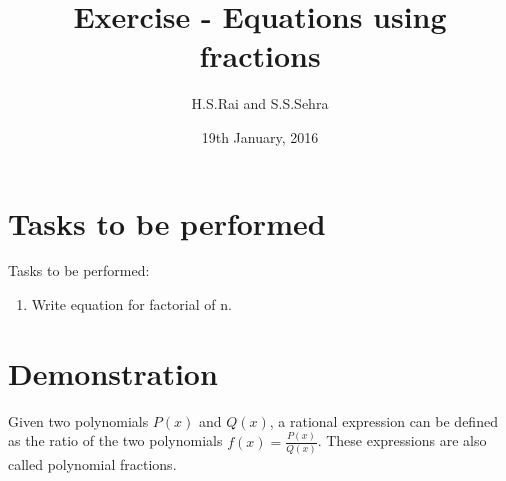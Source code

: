 \documentclass{article}
\title{Exercise  - Equations using fractions}
\author{H.S.Rai and S.S.Sehra}
\date{19th January, 2016}
\begin{document}
	\maketitle
	\section*{Tasks to be performed}
	Tasks to be performed:
	\begin{enumerate}
		\item  Write equation for factorial of n.
	\end{enumerate}
\section*{Demonstration}

Given two polynomials $P(x)$ and $Q(x)$, a rational expression can be defined as the ratio of the two polynomials
$f(x)=\frac{P(x)}{Q(x)}$. These expressions are also called polynomial fractions.
\end{document}
